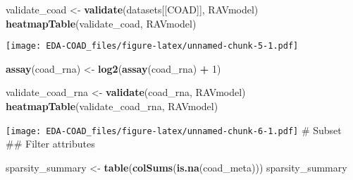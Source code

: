 \documentclass[
]{article}
\newenvironment{Shaded}{\begin{snugshade}}{\end{snugshade}}
\newcommand{\DecValTok}[1]{\textcolor[rgb]{0.00,0.00,0.81}{#1}}
\newcommand{\FunctionTok}[1]{\textcolor[rgb]{0.13,0.29,0.53}{\textbf{#1}}}
\newcommand{\NormalTok}[1]{#1}
\newcommand{\OtherTok}[1]{\textcolor[rgb]{0.56,0.35,0.01}{#1}}
\newcommand{\SpecialCharTok}[1]{\textcolor[rgb]{0.81,0.36,0.00}{\textbf{#1}}}
\newcommand{\StringTok}[1]{\textcolor[rgb]{0.31,0.60,0.02}{#1}}
\begin{document}
\begin{Shaded}
\begin{Highlighting}[]
\NormalTok{validate\_coad }\OtherTok{\textless{}{-}} \FunctionTok{validate}\NormalTok{(datasets[[}\StringTok{\textquotesingle{}COAD\textquotesingle{}}\NormalTok{]], RAVmodel)}
\FunctionTok{heatmapTable}\NormalTok{(validate\_coad, RAVmodel)}
\end{Highlighting}
\end{Shaded}

\texttt{[image: EDA-COAD\_files/figure-latex/unnamed-chunk-5-1.pdf]}

\begin{Shaded}
\begin{Highlighting}[]
\FunctionTok{assay}\NormalTok{(coad\_rna) }\OtherTok{\textless{}{-}} \FunctionTok{log2}\NormalTok{(}\FunctionTok{assay}\NormalTok{(coad\_rna) }\SpecialCharTok{+} \DecValTok{1}\NormalTok{)}

\NormalTok{validate\_coad\_rna }\OtherTok{\textless{}{-}} \FunctionTok{validate}\NormalTok{(coad\_rna, RAVmodel)}
\FunctionTok{heatmapTable}\NormalTok{(validate\_coad\_rna, RAVmodel)}
\end{Highlighting}
\end{Shaded}

\texttt{[image: EDA-COAD\_files/figure-latex/unnamed-chunk-6-1.pdf]} \#
Subset \#\# Filter attributes

\begin{Shaded}
\begin{Highlighting}[]
\NormalTok{sparsity\_summary }\OtherTok{\textless{}{-}} \FunctionTok{table}\NormalTok{(}\FunctionTok{colSums}\NormalTok{(}\FunctionTok{is.na}\NormalTok{(coad\_meta)))}
\NormalTok{sparsity\_summary}
\end{Highlighting}
\end{Shaded}
\end{document}
